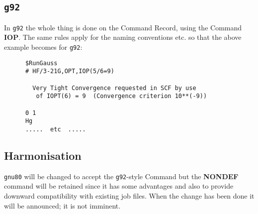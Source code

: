 \subsection{\tt g92}
In {\tt g92} the whole thing is done on the Command Record, using the 
Command {\bf IOP}. The same rules apply for the naming conventions
etc. so that the above example becomes for {\tt g92}:
\begin{verbatim}
      $RunGauss
      # HF/3-21G,OPT,IOP(5/6=9)

        Very Tight Convergence requested in SCF by use
         of IOPT(6) = 9  (Convergence criterion 10**(-9))

      0 1
      Hg
      .....  etc  .....
\end{verbatim}
\subsection{\sf Harmonisation}
{\tt gnu80} will be changed to accept the {\tt g92}-style Command
but the {\bf NONDEF} command will be retained since it has some
advantages and also to provide downward compatibility with existing
job files. When the change has been done it will be announced; it is
not imminent.


